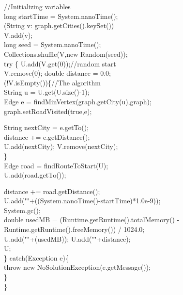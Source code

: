\documentclass[midd]{thesis}
\newcommand{\tab}{\hspace*{2em}}
\begin{document}
\begin{codebox}
\tab//Initializing variables\\
\tab long startTime = System.nanoTime();\\
\tab \For(String v: graph.getCities().keySet())\\
\tab\tab V.add(v);\End\\
\tab long seed = System.nanoTime();\\
\tab Collections.shuffle(V,new Random(seed));\\
\tab try \{
\tab\tab U.add(V.get(0));//random start\\
\tab\tab V.remove(0); double distance = 0.0;\\
\tab\tab \While(!V.isEmpty())\{//The algorithm\\
\tab\tab\tab String u = U.get(U.size()-1);\\
\tab\tab\tab Edge e = findMinVertex(graph.getCity(u),graph);\\
\tab\tab\tab graph.setRoadVisited(true,e);\\
\end{codebox}
\begin{codebox}
\tab\tab\tab String nextCity = e.getTo();\\
\tab\tab\tab distance += e.getDistance();\\
\tab\tab\tab U.add(nextCity); V.remove(nextCity);\\
\tab\tab\}\\\End
\tab\tab Edge road = findRouteToStart(U);\\
\tab\tab U.add(road.getTo());\\
\end{codebox}
\begin{codebox}
\tab\tab distance += road.getDistance();\\
\tab\tab U.add(""+((System.nanoTime()-startTime)*1.0e-9));\\
\tab\tab System.gc();\\
\tab\tab double usedMB = (Runtime.getRuntime().totalMemory() -\\
\tab\tab\tab\tab Runtime.getRuntime().freeMemory()) / 1024.0;\\
\tab\tab U.add(""+(usedMB)); U.add(""+distance);\\
\tab\tab \Return U;\\
\tab \} catch(Exception e)\{\\
\tab\tab throw new NoSolutionException(e.getMessage());\\
\tab\}\\
\}
\end{codebox}
\end{document}
